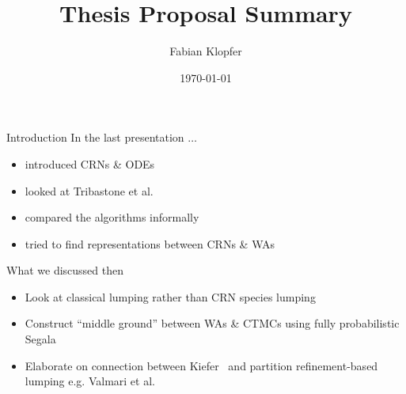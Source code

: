 \documentclass[rgb, pdf]{beamer}
\title{Thesis Proposal Summary}
\author{Fabian Klopfer}
\date{\today}
\institute{Modelling of Complex Self-Organizing Systems Group}
\begin{document}
    \begin{frame}
        \titlepage
    \end{frame}

    \begin{frame}{Introduction}
        In the last presentation $\dots$ \\ \vspace{0.5cm}
        \begin{itemize}
            \item introduced CRNs \& ODEs \\ \vspace{0.7cm}
            \item looked at Tribastone et al.~\autocite{Cardelli2017MaximalAO} \\ \vspace{0.7cm}
            \item compared the algorithms informally \\ \vspace{0.7cm}
            \item tried to find representations between CRNs \& WAs \\ \vspace{0.7cm}
        \end{itemize}
    \end{frame}
    
    \begin{frame}{What we discussed then}
        \begin{itemize}
            \item Look at classical lumping rather than CRN species lumping \\  \vspace{0.7cm}
            \item Construct ``middle ground'' between WAs \& CTMCs using fully probabilistic Segala \\ \vspace{0.7cm}
            \item Elaborate on connection between Kiefer~\autocite{Kiefer2013OnTC} and partition refinement-based lumping e.g. Valmari et al.~\autocite{valmari} \\ \vspace{0.7cm}
        \end{itemize}
    \end{frame}
    
\end{document}
